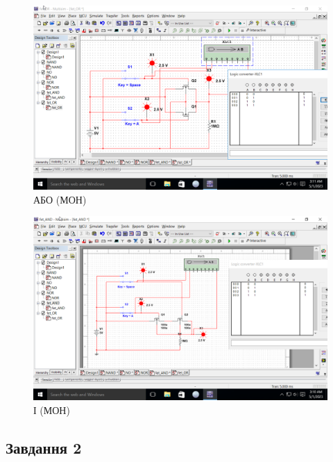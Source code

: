 \documentclass[a4paper, 12pt, oneside]{extarticle}
\begin{document}
\begin{figure}[h]
	\includegraphics[width=\textwidth]{fet_OR}
	\caption{АБО (МОН)}
\end{figure}
\begin{figure}[ht]
	\includegraphics[width=\textwidth]{fet_AND}
	\caption{І (МОН)}
\end{figure}

\clearpage

\subsection*{Завдання 2}
\end{document}
